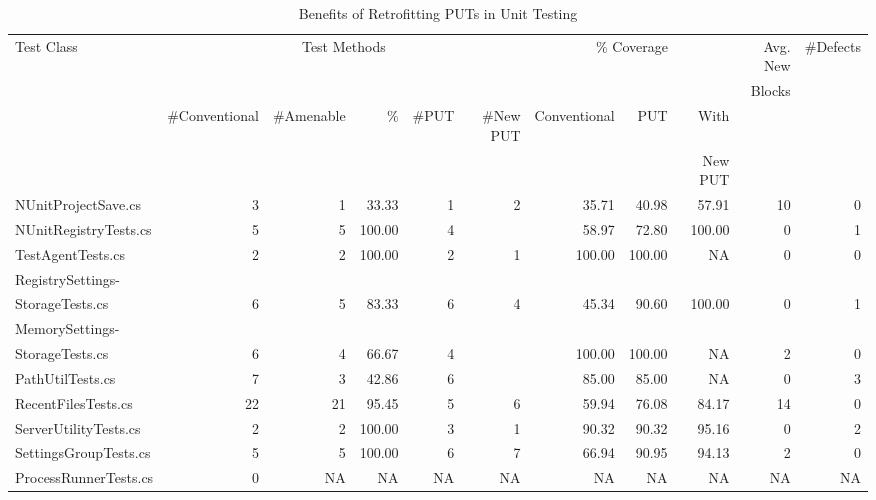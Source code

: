 \begin{table*}[t]
\begin{center}
\centering \caption {\label{tab:oldbenefits} Benefits of Retrofitting PUTs in Unit Testing} \vspace*{0.1in}
\begin {tabular} {|l|r|r|r|r|r|r|r|r|r|r|}
\hline
Test Class						&\multicolumn{5}{|c|}{Test Methods}				& \multicolumn{3}{|c|}{\% Coverage}						&Avg. New	&\#Defects\\
								 			&\multicolumn{5}{|c|}{}										&	\multicolumn{3}{|c|}{}											&Blocks		&\\
\cline{2-9}
											&\#Conventional	&\#Amenable		&\%					&\#PUT		&\#New PUT		&Conventional	&PUT		&With			&		&\\
											&								&							&						&					&							&							&				&New PUT	&		&\\
\hline
NUnitProjectSave.cs		&3							&1						&33.33			&1				&2						&35.71				&40.98	&57.91		&10		&0\\
\hline
NUnitRegistryTests.cs	&5							&5						&100.00			&4				&							&58.97				&72.80	&100.00		&0		&1\\
\hline
TestAgentTests.cs			&2							&2						&100.00			&2				&1						&100.00				&100.00	&NA				&0		&0\\
\hline
RegistrySettings-			&								&							&						&					&							&							&				&					&			&	\\
StorageTests.cs				&6							&5						&83.33			&6				&4						&45.34				&90.60	&100.00		&0		&1\\
\hline
MemorySettings-				&								&							&						&					&							&							&				&					&			&	\\
StorageTests.cs				&6							&4						&66.67			&4				&							&100.00				&100.00	&NA				&2		&0\\
\hline
PathUtilTests.cs			&7							&3						&42.86			&6				&							&85.00				&85.00	&NA				&0		&3\\
\hline
RecentFilesTests.cs		&22							&21						&95.45			&5				&6						&59.94				&76.08	&84.17		&14		&0\\
\hline	
ServerUtilityTests.cs	&2							&2						&100.00			&3				&1						&90.32				&90.32	&95.16		&0		&2\\
\hline
SettingsGroupTests.cs	&5							&5						&100.00			&6				&7						&66.94				&90.95	&94.13		&2		&0\\
\hline
ProcessRunnerTests.cs	&0							&NA						&NA					&NA				&NA						&NA						&NA				&NA			&NA		&NA\\
\hline
\end{tabular}
\end{center}
\end{table*}

